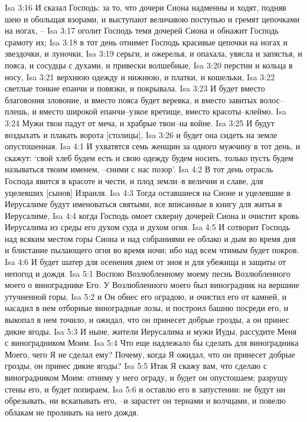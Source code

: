Isa 3:16  И сказал Господь: за то, что дочери Сиона надменны и ходят, подняв шею и обольщая взорами, и выступают величавою поступью и гремят цепочками на ногах, --
Isa 3:17  оголит Господь темя дочерей Сиона и обнажит Господь срамоту их;
Isa 3:18  в тот день отнимет Господь красивые цепочки на ногах и звездочки, и луночки,
Isa 3:19  серьги, и ожерелья, и опахала, увясла и запястья, и пояса, и сосудцы с духами, и привески волшебные,
Isa 3:20  перстни и кольца в носу,
Isa 3:21  верхнюю одежду и нижнюю, и платки, и кошельки,
Isa 3:22  светлые тонкие епанчи и повязки, и покрывала.
Isa 3:23  И будет вместо благовония зловоние, и вместо пояса будет веревка, и вместо завитых волос--плешь, и вместо широкой епанчи--узкое вретище, вместо красоты--клеймо.
Isa 3:24  Мужи твои падут от меча, и храбрые твои--на войне.
Isa 3:25  И будут воздыхать и плакать ворота [столицы],
Isa 3:26  и будет она сидеть на земле опустошенная.
Isa 4:1  И ухватятся семь женщин за одного мужчину в тот день, и скажут: `свой хлеб будем есть и свою одежду будем носить, только пусть будем называться твоим именем, --сними с нас позор'.
Isa 4:2  В тот день отрасль Господа явится в красоте и чести, и плод земли--в величии и славе, для уцелевших [сынов] Израиля.
Isa 4:3  Тогда оставшиеся на Сионе и уцелевшие в Иерусалиме будут именоваться святыми, все вписанные в книгу для житья в Иерусалиме,
Isa 4:4  когда Господь омоет скверну дочерей Сиона и очистит кровь Иерусалима из среды его духом суда и духом огня.
Isa 4:5  И сотворит Господь над всяким местом горы Сиона и над собраниями ее облако и дым во время дня и блистание пылающего огня во время ночи; ибо над всем чтимым будет покров.
Isa 4:6  И будет шатер для осенения днем от зноя и для убежища и защиты от непогод и дождя.
Isa 5:1  Воспою Возлюбленному моему песнь Возлюбленного моего о винограднике Его. У Возлюбленного моего был виноградник на вершине утучненной горы,
Isa 5:2  и Он обнес его оградою, и очистил его от камней, и насадил в нем отборные виноградные лозы, и построил башню посреди его, и выкопал в нем точило, и ожидал, что он принесет добрые грозды, а он принес дикие ягоды.
Isa 5:3  И ныне, жители Иерусалима и мужи Иуды, рассудите Меня с виноградником Моим.
Isa 5:4  Что еще надлежало бы сделать для виноградника Моего, чего Я не сделал ему? Почему, когда Я ожидал, что он принесет добрые грозды, он принес дикие ягоды?
Isa 5:5  Итак Я скажу вам, что сделаю с виноградником Моим: отниму у него ограду, и будет он опустошаем; разрушу стены его, и будет попираем,
Isa 5:6  и оставлю его в запустении: не будут ни обрезывать, ни вскапывать его, --и зарастет он тернами и волчцами, и повелю облакам не проливать на него дождя.

